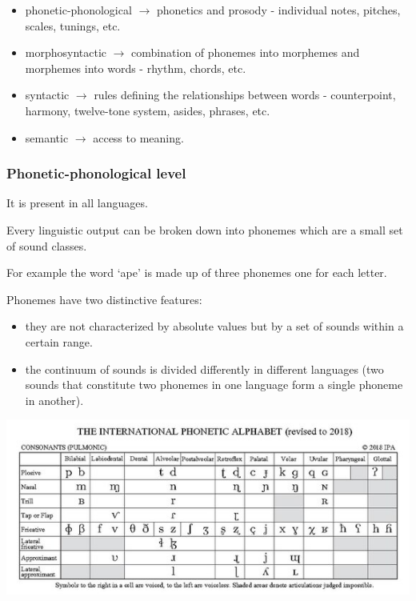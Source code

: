 \begin{itemize}
\tightlist
\item phonetic-phonological \(\rightarrow\) phonetics and prosody - individual notes, pitches, scales, tunings, etc.
\item morphosyntactic \(\rightarrow\) combination of phonemes into morphemes and morphemes into words - rhythm, chords, etc.
\item syntactic \(\rightarrow\) rules defining the relationships between words - counterpoint, harmony, twelve-tone system, asides, phrases, etc.
\item semantic \(\rightarrow\) access to meaning.
\end{itemize}

\subsubsection{Phonetic-phonological level }\label{phonetic-phonological-level}

It is present in all languages.

Every linguistic output can be broken down into phonemes which are a small set of sound classes.

For example the word `ape' is made up of three phonemes one for each letter.

Phonemes have two distinctive features: 

\begin{itemize}
\item they are not characterized by absolute values but by a set of sounds within a certain range. 
\item the continuum of sounds is divided differently in different languages (two sounds that constitute two phonemes in one language form a single phoneme in another).
\end{itemize}

\begin{center}
\includegraphics[scale=0.9]{../img/fonemi_2.png}
\end{center}

